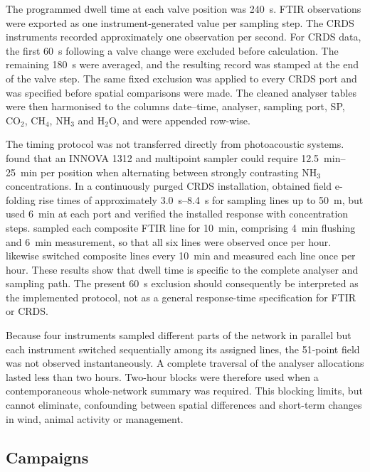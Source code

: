 \documentclass[12pt,a4paper]{article}
\begin{document}
The programmed dwell time at each valve position was \SI{240}{s}. FTIR observations were exported as one instrument-generated value per sampling step. The CRDS instruments recorded approximately one observation per second. For CRDS data, the first \SI{60}{s} following a valve change were excluded before calculation. The remaining \SI{180}{s} were averaged, and the resulting record was stamped at the end of the valve step. The same fixed exclusion was applied to every CRDS port and was specified before spatial comparisons were made. The cleaned analyser tables were then harmonised to the columns date--time, analyser, sampling port, SP, \(\mathrm{CO_2}\), \(\mathrm{CH_4}\), \(\mathrm{NH_3}\) and \(\mathrm{H_2O}\), and were appended row-wise.

The timing protocol was not transferred directly from photoacoustic systems. \citet{Rom2010} found that an INNOVA 1312 and multipoint sampler could require \SIrange{12.5}{25}{min} per position when alternating between strongly contrasting \(\mathrm{NH_3}\) concentrations. In a continuously purged CRDS installation, \citet{Kamp2019} obtained field e-folding rise times of approximately \SIrange{3.0}{8.4}{s} for sampling lines up to \SI{50}{m}, but used \SI{6}{min} at each port and verified the installed response with concentration steps. \citet{Janke2022} sampled each composite FTIR line for \SI{10}{min}, comprising \SI{4}{min} flushing and \SI{6}{min} measurement, so that all six lines were observed once per hour. \citet{Declerck2025} likewise switched composite lines every \SI{10}{min} and measured each line once per hour. These results show that dwell time is specific to the complete analyser and sampling path. The present \SI{60}{s} exclusion should consequently be interpreted as the implemented protocol, not as a general response-time specification for FTIR or CRDS.

Because four instruments sampled different parts of the network in parallel but each instrument switched sequentially among its assigned lines, the 51-point field was not observed instantaneously. A complete traversal of the analyser allocations lasted less than two hours. Two-hour blocks were therefore used when a contemporaneous whole-network summary was required. This blocking limits, but cannot eliminate, confounding between spatial differences and short-term changes in wind, animal activity or management.

\subsection{Campaigns}
\end{document}
